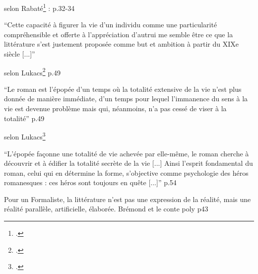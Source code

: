 \documentclass[a4paper,10pt]{article}
\begin{document}
		
		selon Rabaté\footcite{Rabate2010} : p.32-34
		\begin{center}
			\footnotesize
			\begin{minipage}{0.7\textwidth}
				``Cette capacité à figurer la vie d’un individu comme une particularité compréhensible
				et offerte à l’appréciation d’autrui me semble être ce que la littérature s’est justement proposée
				comme but et ambition à partir du XIXe siècle [...]''
			\end{minipage}
		\end{center}
		selon Lukacs\footcite{Lukacs1916} p.49
		\begin{center}
			\footnotesize
			\begin{minipage}{0.7\textwidth}
				``Le roman est l'épopée d'un temps où la totalité extensive de la vie n'est plus donnée de manière immédiate, d'un temps pour lequel l'immanence du sens à la vie est devenue problème mais qui, néanmoins, n'a pas cessé de viser à la totalité'' p.49
			\end{minipage}
		\end{center}
		
		selon Lukacs\footcite{Lukacs1916}
		\begin{center}
			\footnotesize
			\begin{minipage}{0.7\textwidth}
				``L'épopée façonne une totalité de vie achevée par elle-même, le roman cherche à découvrir et à édifier la totalité secrète de la vie [...] Ainsi l'esprit fondamental du roman, celui qui en détermine la forme, s'objective comme psychologie des héros romanesques : ces héros sont toujours en quête [...]'' p.54
			\end{minipage}
		\end{center}
		
		
		
		
			Pour un Formaliste, la littérature n’est pas une expression de la réalité, mais une réalité
			parallèle, artificielle, élaborée. 
			Brémond et le conte poly p43 
			
\end{document}
